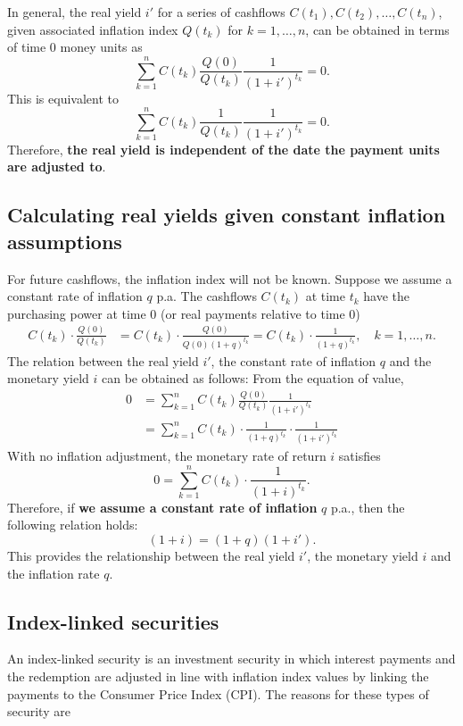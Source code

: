 \documentclass[
]{book}
\theoremstyle{definition}
\theoremstyle{definition}
\theoremstyle{definition}
\theoremstyle{definition}
\theoremstyle{remark}
\begin{document}
In general, the real yield \(i'\) for a series of cashflows
\(C(t_1), C(t_2), \ldots, C(t_n)\), given associated inflation index
\(Q(t_k)\) for \(k = 1, \ldots, n\), can be obtained in terms of time 0
money units as
\[\sum_{k=1}^n C(t_k) \frac{Q(0)}{Q(t_k)} \frac{1}{(1 + i')^{t_k}} = 0.\]
This is equivalent to
\[\sum_{k=1}^n C(t_k) \frac{1}{Q(t_k)} \frac{1}{(1 + i')^{t_k}} = 0.\]
Therefore, \textbf{the real yield is independent of the date the payment units
are adjusted to}.

\subsection{Calculating real yields given constant inflation assumptions}\label{calculating-real-yields-given-constant-inflation-assumptions}

For future cashflows, the inflation index will not be known. Suppose we
assume a constant rate of inflation \(q\) p.a. The cashflows \(C(t_k)\) at
time \(t_k\) have the purchasing power at time 0 (or real payments
relative to time 0) \[\begin{aligned}
    C(t_k) \cdot \frac{Q(0)}{Q(t_k)} &=     C(t_k) \cdot \frac{Q(0)}{Q(0)(1+q)^{t_k}}  =  C(t_k) \cdot \frac{1}{(1+q)^{t_k}} , \quad k = 1, \ldots, n.\end{aligned}\]
The relation between the real yield \(i'\), the constant rate of inflation
\(q\) and the monetary yield \(i\) can be obtained as follows: From the
equation of value, \[\begin{aligned}
    0   &= \sum_{k=1}^n C(t_k) \frac{Q(0)}{Q(t_k)} \frac{1}{(1 + i')^{t_k}} \\
        &=  \sum_{k=1}^n C(t_k)  \cdot \frac{1}{(1+q)^{t_k}}\cdot \frac{1}{(1 + i')^{t_k}}\end{aligned}\]
With no inflation adjustment, the monetary rate of return \(i\) satisfies
\[0 =  \sum_{k=1}^n C(t_k)  \cdot \frac{1}{(1+i)^{t_k}}.\] Therefore, if
\textbf{we assume a constant rate of inflation} \(q\) p.a., then the following
relation holds: \[(1 +i) = ( 1 + q)(1+i').\] This provides the
relationship between the real yield \(i'\), the monetary yield \(i\) and the
inflation rate \(q\).

\subsection{Index-linked securities}\label{index-linked-securities}

An index-linked security is an investment security in which interest
payments and the redemption are adjusted in line with inflation index
values by linking the payments to the Consumer Price Index (CPI). The
reasons for these types of security are
\end{document}
